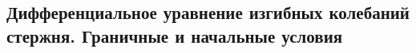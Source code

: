

\subsection{Дифференциальное уравнение изгибных колебаний стержня. Граничные и начальные условия}



